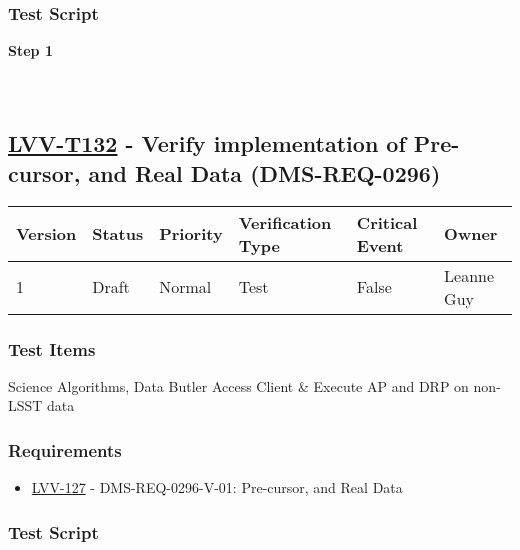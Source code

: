 \hypertarget{test-script-31}{%
\subsubsection{Test Script}\label{test-script-31}}

\textbf{Step 1}\\
~\\
~\\

\hypertarget{lvv-t132---verify-implementation-of-pre-cursor-and-real-data-dms-req-0296}{%
\subsection{\texorpdfstring{\href{https://jira.lsstcorp.org/secure/Tests.jspa\#/testCase/LVV-T132}{LVV-T132}
- Verify implementation of Pre-cursor, and Real Data
(DMS-REQ-0296)}{LVV-T132 - Verify implementation of Pre-cursor, and Real Data (DMS-REQ-0296)}}\label{lvv-t132---verify-implementation-of-pre-cursor-and-real-data-dms-req-0296}}

\begin{longtable}[]{@{}llllll@{}}
\toprule
Version & Status & Priority & Verification Type & Critical Event &
Owner\tabularnewline
\midrule
\endhead
1 & Draft & Normal & Test & False & Leanne Guy\tabularnewline
\bottomrule
\end{longtable}

\hypertarget{test-items-32}{%
\subsubsection{Test Items}\label{test-items-32}}

Science Algorithms, Data Butler Access Client \& Execute AP and DRP on
non-LSST data

\hypertarget{requirements-32}{%
\subsubsection{Requirements}\label{requirements-32}}

\begin{itemize}
\tightlist
\item
  \href{https://jira.lsstcorp.org/browse/LVV-127}{LVV-127} -
  DMS-REQ-0296-V-01: Pre-cursor, and Real Data
\end{itemize}

\hypertarget{test-script-32}{%
\subsubsection{Test Script}\label{test-script-32}}


